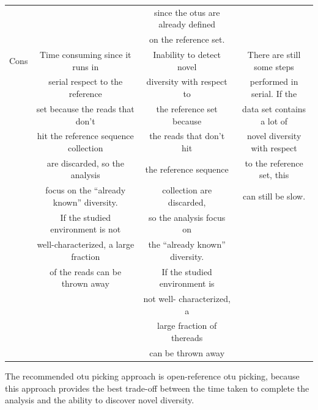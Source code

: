 \begin{table}[htbp]
\begin{tabular*}{\textwidth}{cccc}
     &                         & since the \gls{otu}s are already defined & \\
     &                         & on the reference set. & \\
\midrule
Cons & Time consuming since it runs in         & Inability to detect novel      & There are still some steps\\
     & serial respect to the reference         & diversity with respect to      & performed in serial. If the\\
     & set because the reads that don’t        & the reference set because      & data set contains a lot of\\
     & hit the reference sequence collection   & the reads that don’t hit       & novel diversity with respect\\
     &  are discarded, so the analysis         & the reference sequence         & to the reference set, this\\
     & focus on the “already known” diversity. & collection are discarded,      & can still be slow.\\
     & If the studied environment is not       & so the analysis focus on       &\\
     & well-characterized, a large fraction    & the “already known” diversity. &\\
     & of the reads can be thrown away         & If the studied environment is  &\\
     &                                         & not well- characterized, a     &\\
     &                                         & large fraction of thereads     &\\
     &                                         & can be thrown away             &\\
\bottomrule
\end{tabular*}
\end{table}
\renewcommand{\arraystretch}{1}%

The recommended \gls{otu} picking approach is open-reference \gls{otu} picking,
because this approach provides the best trade-off between the time taken to complete
the analysis and the ability to discover novel diversity.

